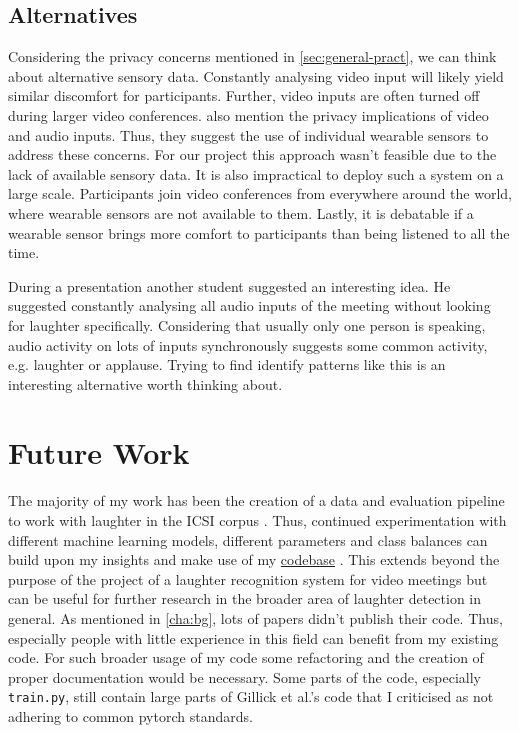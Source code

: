 \documentclass[bsc,frontabs,parskip,deptreport]{infthesis}
\newcommand{\coderepo}{\href{https://github.com/LasseWolter/laughter-detection-icsi}{codebase} }
\begin{document}
\section{Alternatives}
Considering the privacy concerns mentioned in \autoref{sec:general-pract}, we can think about alternative sensory data. 
Constantly analysing video input will likely yield similar discomfort for participants. Further, video inputs are often turned off during larger video conferences.
\citet{cosentino2016quantitative}  also mention the privacy implications of video and audio inputs.
Thus, they suggest the use of individual wearable sensors to address these concerns. For our project this approach wasn't feasible due to the lack of available sensory data.
It is also impractical to deploy such a system on a large scale. Participants join video conferences from everywhere around the world, where wearable sensors are not available to them. Lastly, it is debatable if a wearable sensor brings more comfort to participants than being listened to all the time. 

During a presentation another student suggested an interesting idea. He suggested constantly analysing all audio inputs of the meeting without looking for laughter specifically. Considering that usually only one person is speaking, audio activity on lots of inputs synchronously suggests some common activity, e.g. laughter or applause. Trying to find identify patterns like this is an interesting alternative worth thinking about. 

\chapter{Future Work}
The majority of my work has been the creation of a data and evaluation pipeline to work with laughter in the ICSI corpus \citep{morgan2001meeting}. 
Thus, continued experimentation with different machine learning models, different parameters and class balances can build upon my insights and make use of my \coderepo.
This extends beyond the purpose of the project of a laughter recognition system for video meetings but can be useful for further research in the broader area of laughter detection in general. 
As mentioned in \autoref{cha:bg}, lots of papers didn't publish their code.
Thus, especially people with little experience in this field can benefit from my existing code. 
For such broader usage of my code some refactoring and the creation of proper documentation would be necessary.
Some parts of the code, especially \verb|train.py|, still contain large parts of Gillick et al.'s code that I criticised as not adhering to common pytorch standards. 
\end{document}
